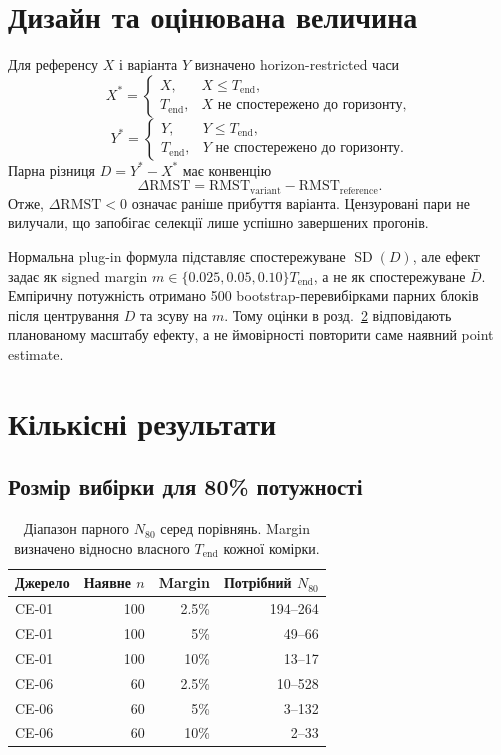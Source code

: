 \documentclass[11pt,a4paper]{article}
\begin{document}
\section{Дизайн та оцінювана величина}\label{sec:design}

Для референсу $X$ і варіанта $Y$ визначено horizon-restricted часи
\[
 X^*=\begin{cases}
 X,&X\leq T_{\mathrm{end}},\\
 T_{\mathrm{end}},&X\text{ не спостережено до горизонту},
 \end{cases}
\]
\[
 Y^*=\begin{cases}
 Y,&Y\leq T_{\mathrm{end}},\\
 T_{\mathrm{end}},&Y\text{ не спостережено до горизонту}.
 \end{cases}
\]
Парна різниця $D=Y^*-X^*$ має конвенцію
\[
 \Delta\mathrm{RMST}=\mathrm{RMST}_{\mathrm{variant}}-
 \mathrm{RMST}_{\mathrm{reference}}.
\]
Отже, $\Delta\mathrm{RMST}<0$ означає раніше прибуття варіанта. Цензуровані
пари не вилучали, що запобігає селекції лише успішно завершених прогонів.

Нормальна plug-in формула підставляє спостережуване $\operatorname{SD}(D)$,
але ефект задає як signed margin $m\in\{0.025,0.05,0.10\}T_{\mathrm{end}}$,
а не як спостережуване $\bar D$. Емпіричну потужність отримано 500
bootstrap-перевибірками парних блоків після центрування $D$ та зсуву на $m$.
Тому оцінки в розд.~\ref{sec:results} відповідають планованому масштабу
ефекту, а не ймовірності повторити саме наявний point estimate.

\section{Кількісні результати}\label{sec:results}

\subsection{Розмір вибірки для 80\% потужності}

\begin{table}[H]
\centering
\caption{Діапазон парного $N_{80}$ серед порівнянь. Margin визначено відносно
власного $T_{\mathrm{end}}$ кожної комірки.}
\label{tab:n80}
\begin{tabular}{lrrr}
\toprule
Джерело & Наявне $n$ & Margin & Потрібний $N_{80}$ \\
\midrule
CE-01 & 100 & 2.5\% & 194--264 \\
CE-01 & 100 & 5\%   & 49--66 \\
CE-01 & 100 & 10\%  & 13--17 \\
CE-06 & 60  & 2.5\% & 10--528 \\
CE-06 & 60  & 5\%   & 3--132 \\
CE-06 & 60  & 10\%  & 2--33 \\
\bottomrule
\end{tabular}
\end{table}
\end{document}

